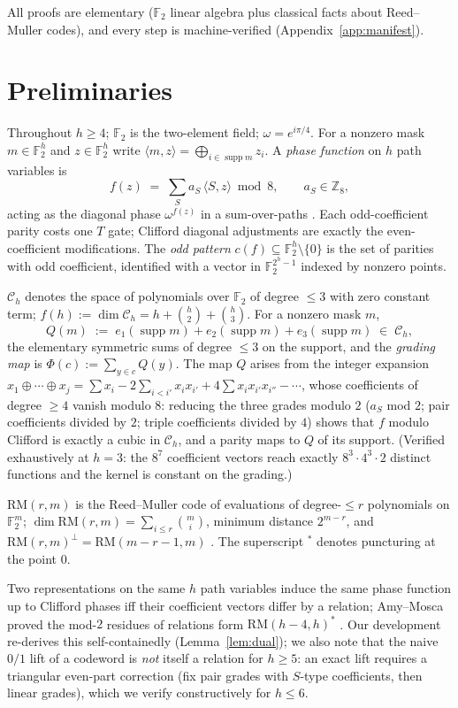 \documentclass[11pt]{article}
\theoremstyle{definition}
\theoremstyle{remark}
\newcommand{\F}{\mathbb{F}_2}
\newcommand{\Z}{\mathbb{Z}}
\newcommand{\RM}{\mathrm{RM}}
\newcommand{\supp}{\operatorname{supp}}
\newcommand{\Ch}{\mathcal{C}_h}
\newcommand{\ip}[2]{\langle #1,#2\rangle}
\begin{document}
All proofs are elementary ($\F$ linear algebra plus classical facts about Reed--Muller codes),
and every step is machine-verified (Appendix~\ref{app:manifest}).

\section{Preliminaries}

Throughout $h\ge 4$; $\F$ is the two-element field; $\omega=e^{i\pi/4}$. For a nonzero mask $m\in\F^h$ and $z\in\F^h$ write
$\ip mz=\bigoplus_{i\in\supp m}z_i$. A \emph{phase function} on $h$ path variables is
\[
  f(z)\;=\;\sum_S a_S\,\ip Sz \bmod 8,\qquad a_S\in\Z_8,
\]
acting as the diagonal phase $\omega^{f(z)}$ in a sum-over-paths \cite{DHH05,Amy19}. Each odd-coefficient
parity costs one $T$ gate; Clifford diagonal adjustments are exactly the even-coefficient modifications.
The \emph{odd pattern} $c(f)\subseteq\F^h\setminus\{0\}$ is the set of parities with odd coefficient, identified
with a vector in $\F^{2^h-1}$ indexed by nonzero points.

$\Ch$ denotes the space of polynomials over $\F$ of degree $\le 3$ with zero constant term; $f(h):=
\dim\Ch=h+\binom h2+\binom h3$. For a nonzero mask $m$,
\[
  Q(m)\;:=\;e_1(\supp m)+e_2(\supp m)+e_3(\supp m)\;\in\;\Ch,
\]
the elementary symmetric sums of degree $\le 3$ on the support, and the \emph{grading map} is $\Phi(c):=
\sum_{y\in c}Q(y)$. The map $Q$ arises from the integer expansion $x_1\oplus\cdots\oplus x_j=\sum x_i-2\sum_{i<i'}x_ix_{i'}+
4\sum x_ix_{i'}x_{i''}-\cdots$, whose coefficients of degree $\ge 4$ vanish modulo $8$: reducing the three grades
modulo $2$ ($a_S$ mod $2$; pair coefficients divided by $2$; triple coefficients divided by $4$) shows that
$f$ modulo Clifford is exactly a cubic in $\Ch$, and a parity maps to $Q$ of its support. (Verified
exhaustively at $h=3$: the $8^7$ coefficient vectors reach exactly $8^3\cdot4^3\cdot2$ distinct functions and
the kernel is constant on the grading.)

$\RM(r,m)$ is the Reed--Muller code of evaluations of degree-$\le r$ polynomials on $\F^m$;
$\dim\RM(r,m)=\sum_{i\le r}\binom mi$, minimum distance $2^{m-r}$, and $\RM(r,m)^{\perp}=\RM(m-r-1,m)$
\cite{MS77}. The superscript ${}^{*}$ denotes puncturing at the point $0$.

Two representations on the same $h$ path variables induce the same phase function up to Clifford
phases iff their coefficient vectors differ by a relation; Amy--Mosca proved the mod-$2$ residues of
relations form $\RM(h-4,h)^{*}$ \cite{AM19}. Our development re-derives this self-containedly
(Lemma~\ref{lem:dual}); we also note that the naive $0/1$ lift of a codeword is \emph{not} itself a relation
for $h\ge5$: an exact lift requires a triangular even-part correction (fix pair grades with $S$-type
coefficients, then linear grades), which we verify constructively for $h\le6$.
\end{document}
